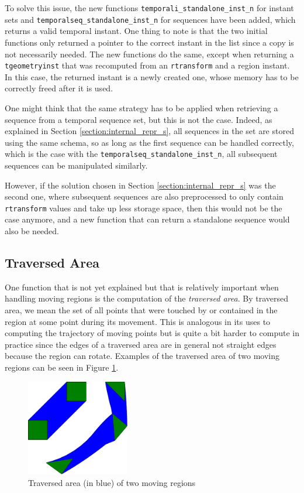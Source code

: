 To solve this issue, the new functions \lstinline{temporali_standalone_inst_n} for instant sets and \lstinline{temporalseq_standalone_inst_n} for sequences have been added, which returns a valid temporal instant. One thing to note is that the two initial functions only returned a pointer to the correct instant in the list since a copy is not necessarily needed. The new functions do the same, except when returning a \lstinline+tgeometryinst+ that was recomputed from an \lstinline+rtransform+ and a region instant. In this case, the returned instant is a newly created one, whose memory has to be correctly freed after it is used.

One might think that the same strategy has to be applied when retrieving a sequence from a temporal sequence set, but this is not the case. Indeed, as explained in Section \ref{section:internal_repr_s}, all sequences in the set are stored using the same schema, so as long as the first sequence can be handled correctly, which is the case with the \lstinline{temporalseq_standalone_inst_n}, all subsequent sequences can be manipulated similarly.

However, if the solution chosen in Section \ref{section:internal_repr_s} was the second one, where subsequent sequences are also preprocessed to only contain \lstinline+rtransform+ values and take up less storage space, then this would not be the case anymore, and a new function that can return a standalone sequence would also be needed.

\subsection{Traversed Area}
\label{section:traversed_area}

One function that is not yet explained but that is relatively important when handling moving regions is the computation of the \textit{traversed area}. By traversed area, we mean the set of all points that were touched by or contained in the region at some point during its movement. This is analogous in its uses to computing the trajectory of moving points but is quite a bit harder to compute in practice since the edges of a traversed area are in general not straight edges because the region can rotate. Examples of the traversed area of two moving regions can be seen in Figure \ref{fig:traversed_area_examples}.

\begin{figure}[h!]
    \centering
    \includegraphics[width=0.4\textwidth]{images/traversed_area_example.pdf}
    \caption[Traversed area of two moving regions]{Traversed area (in blue) of two moving regions}
    \label{fig:traversed_area_examples}
\end{figure}

